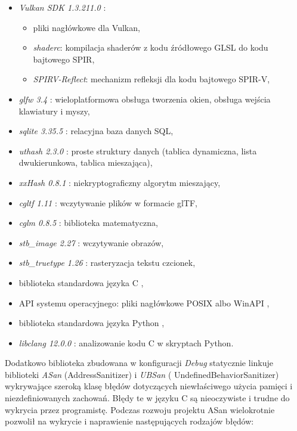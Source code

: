 \begin{itemize}
	\item {\textit{Vulkan SDK 1.3.211.0}} \cite{VULKANSDK}:
	\begin{itemize}
		\item pliki nagłówkowe dla Vulkan,
		\item \textit{shaderc}: kompilacja shaderów z kodu źródłowego GLSL do kodu bajtowego SPIR,
		\item \textit{SPIRV-Reflect}: mechanizm refleksji dla kodu bajtowego SPIR-V,
	\end{itemize}
	\item {\textit{glfw 3.4}} \cite{GLFW}: wieloplatformowa obsługa tworzenia okien, obsługa wejścia klawiatury i myszy,
	\item {\textit{sqlite 3.35.5}} \cite{SQLITE}: relacyjna baza danych SQL,
	\item {\textit{uthash 2.3.0}} \cite{UTHASH}: proste struktury danych (tablica dynamiczna, lista dwukierunkowa, tablica mieszająca),
	\item {\textit{xxHash 0.8.1}} \cite{XXHASH}: niekryptograficzny algorytm mieszający,
	\item {\textit{cgltf 1.11}} \cite{CGLTF}: wczytywanie plików w formacie glTF,
	\item {\textit{cglm 0.8.5}} \cite{CGLM}: biblioteka matematyczna,
	\item {\textit{stb\_image 2.27}} \cite{STB}: wczytywanie obrazów,
	\item {\textit{stb\_truetype 1.26}} \cite{STB}: rasteryzacja tekstu czcionek,
	\item {biblioteka standardowa języka C} \cite{C11REFERENCE},
	\item {API systemu operacyjnego}: pliki nagłówkowe POSIX \cite{POSIXREFERENCE} albo WinAPI \cite{WINAPIREFERENCE},
	\item {biblioteka standardowa języka Python \cite{PYTHONREFERENCE}},
	\item {\textit{libclang 12.0.0}} \cite{LIBCLANG}: analizowanie kodu C w skryptach Python.
\end{itemize}

Dodatkowo biblioteka zbudowana w konfiguracji \textit{Debug} statycznie linkuje biblioteki \textit{ASan} (AddressSanitizer) i \textit{UBSan} (
UndefinedBehaviorSanitizer) wykrywające szeroką klasę błędów dotyczących niewłaściwego użycia pamięci i niezdefiniowanych zachowań. Błędy te w języku C są nieoczywiste i trudne do wykrycia przez programistę. Podczas rozwoju projektu ASan wielokrotnie pozwolił na wykrycie i naprawienie następujących rodzajów błędów:

